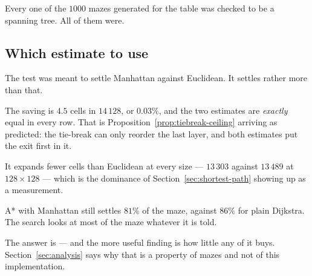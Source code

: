 Every one of the $1000$ mazes generated for the table was checked to be a
spanning tree. All of them were.

\subsection{Which estimate to use}

The test was meant to settle Manhattan against Euclidean. It settles rather more
than that.

\begin{description}[leftmargin=*,style=nextline,itemsep=5pt]
  \item[As a tie-break, neither.] The saving is $4.5$ cells in $14\,128$, or
    $0.03\%$, and the two estimates are \emph{exactly} equal in every row. That
    is Proposition~\ref{prop:tiebreak-ceiling} arriving as predicted: the
    tie-break can only reorder the last layer, and both estimates put the exit
    first in it.
  \item[As a priority, Manhattan.] It expands fewer cells than Euclidean at
    every size --- $13\,303$ against $13\,489$ at $128\times128$ --- which is
    the dominance of Section~\ref{sec:shortest-path} showing up as a
    measurement.
  \item[But the gain is small either way.] A* with Manhattan still settles
    $81\%$ of the maze, against $86\%$ for plain Dijkstra. The search looks at
    most of the maze whatever it is told.
\end{description}

\begin{keypoint}
The answer is  --- and the more useful
finding is how little any of it buys. Section~\ref{sec:analysis} says why that
is a property of mazes and not of this implementation.
\end{keypoint}
